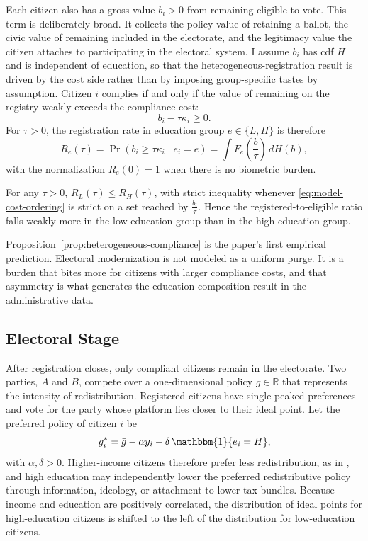 Each citizen also has a gross value $b_i>0$ from remaining eligible to vote. This term is deliberately broad. It collects the policy value of retaining a ballot, the civic value of remaining included in the electorate, and the legitimacy value the citizen attaches to participating in the electoral system. I assume $b_i$ has cdf $H$ and is independent of education, so that the heterogeneous-registration result is driven by the cost side rather than by imposing group-specific tastes by assumption. Citizen $i$ complies if and only if the value of remaining on the registry weakly exceeds the compliance cost:
\begin{equation}
\label{eq:model-register-rule}
b_i - \tau \kappa_i \geq 0.
\end{equation}
For $\tau>0$, the registration rate in education group $e \in \{L,H\}$ is therefore
\begin{equation}
\label{eq:model-registration-rate}
R_e(\tau)=\Pr(b_i \geq \tau \kappa_i \mid e_i=e)=\int F_e\!\left(\frac{b}{\tau}\right)\,dH(b),
\end{equation}
with the normalization $R_e(0)=1$ when there is no biometric burden.

\begin{proposition}
\label{prop:heterogeneous-compliance}
For any $\tau>0$, $R_L(\tau)\leq R_H(\tau)$, with strict inequality whenever \eqref{eq:model-cost-ordering} is strict on a set reached by $\frac{b_i}{\tau}$. Hence the registered-to-eligible ratio falls weakly more in the low-education group than in the high-education group.
\end{proposition}

Proposition~\ref{prop:heterogeneous-compliance} is the paper's first empirical prediction. Electoral modernization is not modeled as a uniform purge. It is a burden that bites more for citizens with larger compliance costs, and that asymmetry is what generates the education-composition result in the administrative data.

\subsection{Electoral Stage}

After registration closes, only compliant citizens remain in the electorate. Two parties, $A$ and $B$, compete over a one-dimensional policy $g \in \mathbb{R}$ that represents the intensity of redistribution. Registered citizens have single-peaked preferences and vote for the party whose platform lies closer to their ideal point. Let the preferred policy of citizen $i$ be
\begin{equation}
\label{eq:model-ideal-policy}
g_i^\ast = \bar g - \alpha y_i - \delta \,\mathbbm{1}\{e_i=H\},
\end{equation}
with $\alpha,\delta>0$. Higher-income citizens therefore prefer less redistribution, as in \citet{meltzerRichard1981}, and high education may independently lower the preferred redistributive policy through information, ideology, or attachment to lower-tax bundles. Because income and education are positively correlated, the distribution of ideal points for high-education citizens is shifted to the left of the distribution for low-education citizens.

